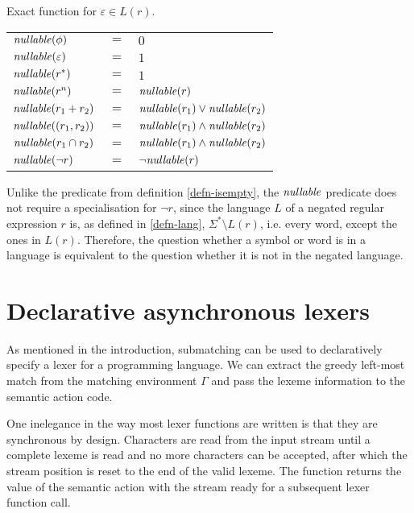 \begin{defn}[Nullability]
   \label{defn-nullable}
   Exact function for $\varepsilon \in L(r)$.

   \begin{tabular}{lll}
      $\mathit{nullable}(\phi)$		& $=$ & $0$ \\
      $\mathit{nullable}(\varepsilon)$	& $=$ & $1$ \\
      $\mathit{nullable}(r^*)$		& $=$ & $1$ \\
      $\mathit{nullable}(r^n)$		& $=$ & $\mathit{nullable}(r)$ \\
      $\mathit{nullable}(r_1 + r_2)$	& $=$ & $\mathit{nullable}(r_1) \vee \mathit{nullable}(r_2)$ \\
      $\mathit{nullable}((r_1, r_2))$	& $=$ & $\mathit{nullable}(r_1) \wedge \mathit{nullable}(r_2)$ \\
      $\mathit{nullable}(r_1 \cap r_2)$	& $=$ & $\mathit{nullable}(r_1) \wedge \mathit{nullable}(r_2)$ \\
      $\mathit{nullable}(\neg r)$	& $=$ & $\neg\mathit{nullable}(r)$ \\
   \end{tabular}

\end{defn}

Unlike the predicate from definition \ref{defn-isempty}, the $\mathit{nullable}$
predicate does not require a specialisation for $\neg r$, since the language $L$
of a negated regular expression $r$ is, as defined in \ref{defn-lang}, $\Sigma^*
\setminus L(r)$, i.e. every word, except the ones in $L(r)$. Therefore, the
question whether a symbol or word is in a language is equivalent to the question
whether it is not in the negated language.


\section{Declarative asynchronous lexers}
\label{lexer}

As mentioned in the introduction, submatching can be used to declaratively
specify a lexer for a programming language. We can extract the greedy left-most
match from the matching environment $\Gamma$ and pass the lexeme information to
the semantic action code.

One inelegance in the way most lexer functions are written is that they are
synchronous by design. Characters are read from the input stream until a
complete lexeme is read and no more characters can be accepted, after which the
stream position is reset to the end of the valid lexeme. The function returns
the value of the semantic action with the stream ready for a subsequent lexer
function call.

